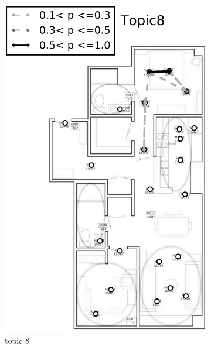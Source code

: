 \documentclass{article}
\begin{document}
\begin{figure}[!t]
\begin{subfigure}{0.32\linewidth}
    \includegraphics[width=\linewidth]{figures/adl_tm/topic8_bw_cp}
    \caption{topic 8}
    \label{fig:adl_tm-8}
\end{subfigure}
\begin{subfigure}{0.32\linewidth}

\end{subfigure}
\end{figure}
\end{document}

